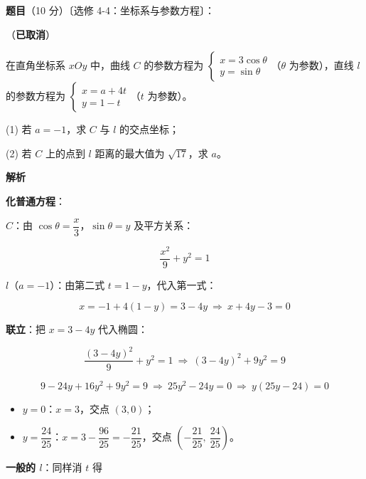 \begin{answer}

\textbf{题目}（10 分）〔选修 4-4：坐标系与参数方程〕：

（\textbf{已取消}）

在直角坐标系 $xOy$ 中，曲线 $C$ 的参数方程为 $\begin{cases}x=3\cos\theta\\ y=\sin\theta\end{cases}$（$\theta$ 为参数），直线 $l$ 的参数方程为 $\begin{cases}x=a+4t\\ y=1-t\end{cases}$（$t$ 为参数）。

  (1) 若 $a=-1$，求 $C$ 与 $l$ 的交点坐标；

  (2) 若 $C$ 上的点到 $l$ 距离的最大值为 $\sqrt{17}$，求 $a$。

\textbf{解析}


\textbf{化普通方程}：

$C$：由 $\cos\theta=\dfrac x3$，$\sin\theta=y$ 及平方关系：

\nopagebreak[4]
\[\frac{x^{2}}9+y^{2}=1\]

$l$（$a=-1$）：由第二式 $t=1-y$，代入第一式：

\nopagebreak[4]
\[x=-1+4(1-y)=3-4y\ \Longrightarrow\ x+4y-3=0\]

\textbf{联立}：把 $x=3-4y$ 代入椭圆：

\nopagebreak[4]
\[\frac{(3-4y)^{2}}9+y^{2}=1\ \Longrightarrow\ (3-4y)^{2}+9y^{2}=9\]

\nopagebreak[4]
\[9-24y+16y^{2}+9y^{2}=9\ \Longrightarrow\ 25y^{2}-24y=0\ \Longrightarrow\ y(25y-24)=0\]

\begin{itemize}
\item $y=0$：$x=3$，交点 $(3,0)$；
\item $y=\dfrac{24}{25}$：$x=3-\dfrac{96}{25}=-\dfrac{21}{25}$，交点 $\left(-\dfrac{21}{25},\ \dfrac{24}{25}\right)$。
\end{itemize}


\textbf{一般的 $l$}：同样消 $t$ 得


\end{answer}
